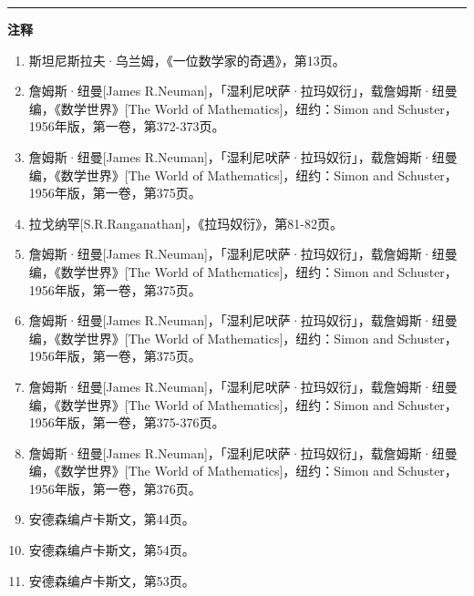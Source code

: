 \documentclass[
  12pt,
  twoside,
  openright,
  oldfontcommands,
]{memoir}
\begin{document}
{\footnotesize\setlength{\parindent}{0pt}%
\noindent\textcolor{rulegray}{\rule{0.35\linewidth}{0.3pt}}\par\vspace{2pt}
\noindent\textbf{注释}\par\vspace{3pt}
\begin{enumerate}
\label{fn:Chapter17-1}{}
\item 斯坦尼斯拉夫·乌兰姆，《一位数学家的奇遇》，第13页。
\label{fn:Chapter17-2}{}
\item 詹姆斯·纽曼[James R.Neuman]，「湿利尼吠萨·拉玛奴衍」，载詹姆斯·纽曼编，《数学世界》[The World of Mathematics]，纽约：Simon and Schuster，1956年版，第一卷，第372-373页。
\label{fn:Chapter17-3}{}
\item 詹姆斯·纽曼[James R.Neuman]，「湿利尼吠萨·拉玛奴衍」，载詹姆斯·纽曼编，《数学世界》[The World of Mathematics]，纽约：Simon and Schuster，1956年版，第一卷，第375页。
\label{fn:Chapter17-4}{}
\item 拉戈纳罕[S.R.Ranganathan]，《拉玛奴衍》，第81-82页。
\label{fn:Chapter17-5}{}
\item 詹姆斯·纽曼[James R.Neuman]，「湿利尼吠萨·拉玛奴衍」，载詹姆斯·纽曼编，《数学世界》[The World of Mathematics]，纽约：Simon and Schuster，1956年版，第一卷，第375页。
\label{fn:Chapter17-6}{}
\item 詹姆斯·纽曼[James R.Neuman]，「湿利尼吠萨·拉玛奴衍」，载詹姆斯·纽曼编，《数学世界》[The World of Mathematics]，纽约：Simon and Schuster，1956年版，第一卷，第375页。
\label{fn:Chapter17-7}{}
\item 詹姆斯·纽曼[James R.Neuman]，「湿利尼吠萨·拉玛奴衍」，载詹姆斯·纽曼编，《数学世界》[The World of Mathematics]，纽约：Simon and Schuster，1956年版，第一卷，第375-376页。
\label{fn:Chapter17-8}{}
\item 詹姆斯·纽曼[James R.Neuman]，「湿利尼吠萨·拉玛奴衍」，载詹姆斯·纽曼编，《数学世界》[The World of Mathematics]，纽约：Simon and Schuster，1956年版，第一卷，第376页。
\label{fn:Chapter17-9}{}
\item 安德森编卢卡斯文，第44页。
\label{fn:Chapter17-10}{}
\item 安德森编卢卡斯文，第54页。
\label{fn:Chapter17-11}{}
\item 安德森编卢卡斯文，第53页。
\end{enumerate}
}
\end{document}
